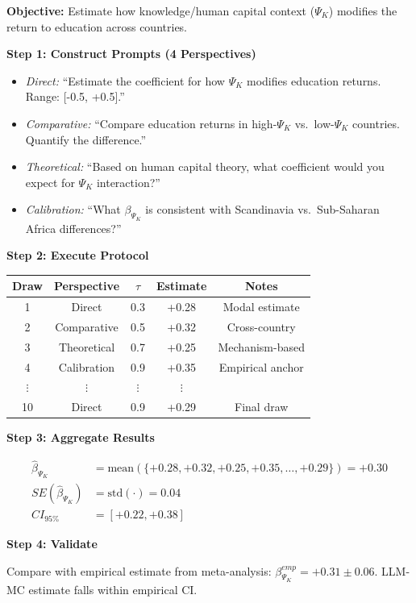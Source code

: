 \begin{tcolorbox}[colback=blue!5!white, colframe=blue!75!black,
    title=\textbf{Worked Example: LLM-MC Protocol Application}]

\textbf{Objective:} Estimate how knowledge/human capital context ($\Psi_K$)
modifies the return to education across countries.

\textbf{Step 1: Construct Prompts (4 Perspectives)}

\begin{itemize}[nosep]
    \item \textit{Direct:} ``Estimate the coefficient for how $\Psi_K$ modifies
          education returns. Range: [-0.5, +0.5].''
    \item \textit{Comparative:} ``Compare education returns in high-$\Psi_K$
          vs.\ low-$\Psi_K$ countries. Quantify the difference.''
    \item \textit{Theoretical:} ``Based on human capital theory, what coefficient
          would you expect for $\Psi_K$ interaction?''
    \item \textit{Calibration:} ``What $\beta_{\Psi_K}$ is consistent with
          Scandinavia vs.\ Sub-Saharan Africa differences?''
\end{itemize}

\textbf{Step 2: Execute Protocol}

\begin{center}
\small
\begin{tabular}{@{}ccccc@{}}
\toprule
Draw & Perspective & $\tau$ & Estimate & Notes \\
\midrule
1 & Direct & 0.3 & +0.28 & Modal estimate \\
2 & Comparative & 0.5 & +0.32 & Cross-country \\
3 & Theoretical & 0.7 & +0.25 & Mechanism-based \\
4 & Calibration & 0.9 & +0.35 & Empirical anchor \\
$\vdots$ & $\vdots$ & $\vdots$ & $\vdots$ & \\
10 & Direct & 0.9 & +0.29 & Final draw \\
\bottomrule
\end{tabular}
\end{center}

\textbf{Step 3: Aggregate Results}

\begin{align*}
\hat{\beta}_{\Psi_K} &= \text{mean}(\{+0.28, +0.32, +0.25, +0.35, \ldots, +0.29\}) = +0.30 \\
SE(\hat{\beta}_{\Psi_K}) &= \text{std}(\cdot) = 0.04 \\
CI_{95\%} &= [+0.22, +0.38]
\end{align*}

\textbf{Step 4: Validate}

Compare with empirical estimate from meta-analysis: $\beta_{\Psi_K}^{emp} = +0.31 \pm 0.06$.
LLM-MC estimate falls within empirical CI. \checkmark

\end{tcolorbox}

